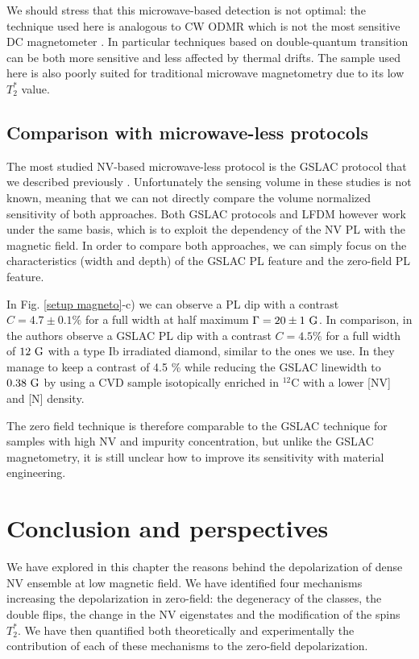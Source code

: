 \documentclass[a4paper, 11pt]{report}
\begin{document}
We should stress that this microwave-based detection is not optimal: the technique used here is analogous to CW ODMR which is not the most sensitive DC magnetometer \citep{barry2020sensitivity}. In particular techniques based on double-quantum transition can be both more sensitive and less affected by thermal drifts. The sample used here is also poorly suited for traditional microwave magnetometry due to its low $T_2^*$ value. 

\subsection{Comparison with microwave-less protocols}
The most studied NV-based microwave-less protocol is the GSLAC protocol that we described previously \citep{wickenbrock2016microwave, zheng2020microwave}. Unfortunately the sensing volume in these studies is not known, meaning that we can not directly compare the volume normalized sensitivity of both approaches. Both GSLAC protocols and LFDM however work under the same basis, which is to exploit the dependency of the NV PL with the magnetic field. In order to compare both approaches, we can simply focus on the characteristics (width and depth) of the GSLAC PL feature and the zero-field PL feature.

In Fig. \ref{setup magneto}-c) we can observe a PL dip with a contrast $C=4.7\pm 0.1 \% $ for a full width at half maximum $\Gamma=20 \pm 1\ \rm G$. In comparison, in \citep{wickenbrock2016microwave} the authors observe a GSLAC PL dip with a contrast $C=4.5 \%$ for a full width of $12 \ \rm G$ with a type Ib irradiated diamond, similar to the ones we use. In \citep{zheng2020microwave} they manage to keep a contrast of 4.5 \% while reducing the GSLAC linewidth to $0.38\ \rm G$ by using a CVD sample isotopically enriched in $^{12}$C with a lower [NV] and [N] density.

The zero field technique is therefore comparable to the GSLAC technique for samples with high NV and impurity concentration, but unlike the GSLAC magnetometry, it is still unclear how to improve its sensitivity with material engineering.

\section{Conclusion and perspectives}
We have explored in this chapter the reasons behind the depolarization of dense NV ensemble at low magnetic field. We have identified four mechanisms increasing the depolarization in zero-field: the degeneracy of the classes, the double flips, the change in the NV eigenstates and the modification of the spins $T_2^*$. We have then quantified both theoretically and experimentally the contribution of each of these mechanisms to the zero-field depolarization.
\end{document}
